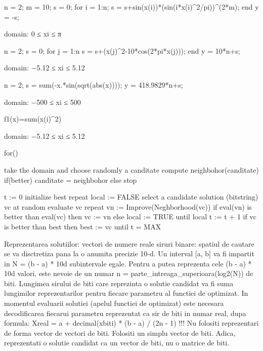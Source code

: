 

n = 2;
m = 10;
s = 0;
for i = 1:n;
    s = s+sin(x(i))*(sin(i*x(i)^2/pi))^(2*m);
end
y = -s;

domain:
0 ≤ xi ≤ π

n = 2; 
s = 0;
for j = 1:n
    s = s+(x(j)^2-10*cos(2*pi*x(j))); 
end
y = 10*n+s;

domain:
−5.12 ≤ xi ≤ 5.12

n = 2;
s = sum(-x.*sin(sqrt(abs(x))));
y = 418.9829*n+s;

domain:
−500 ≤ xi ≤ 500

f1(x)=sum(x(i)^2)

domain:
−5.12 ≤ xi ≤ 5.12




for()

take the domain and choose randomly a canditate
compute neighbohor(canditate)
if(better)
    canditate = neighbohor
else
    stop


t := 0
initialize best
repeat
    local := FALSE
    select a candidate solution (bitstring) vc at random
    evaluate vc
    repeat
        vn := Improve(Neghborhood(vc))
 	if eval(vn) is better than eval(vc)
	then vc := vn
	else local := TRUE
    until local
    t := t + 1
    if vc is better than best
    then best := vc
until t = MAX

Reprezentarea solutiilor:
    vectori de numere reale
    siruri binare: spatiul de cautare se va disctretiza pana la o anumita precizie 10-d.
    Un interval [a, b] va fi impartit in N = (b - a) * 10d subintervale egale.
    Pentru a putea reprezenta cele (b - a) * 10d valori, este nevoie de un numar n = parte_intreaga_superioara(log2(N)) de biti.
    Lungimea sirului de biti care reprezinta o solutie candidat va fi suma lungimilor reprezentarilor pentru fiecare parametru al functiei de optimizat.
    In momentul evaluarii solutiei (apelul functiei de optimizat) este necesara decodificarea fiecarui parametru reprezentat ca sir de biti in numar real, dupa formula:
    Xreal = a + decimal(xbiti) * (b - a) / (2n - 1)
    !!! Nu folositi reprezentari de forma vector de vectori de biti. Folositi un simplu vector de biti.
    Adica, reprezentati o solutie candidat ca un vector de biti, nu o matrice de biti.